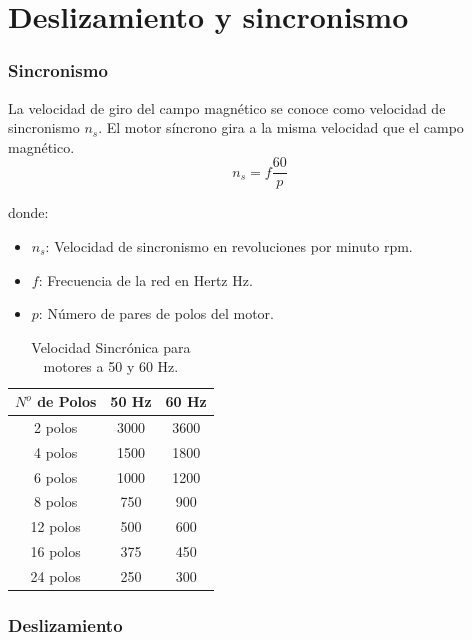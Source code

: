 \documentclass[../main]{subfiles}
\begin{document}
\chapter{Deslizamiento y sincronismo}
\begin{center}
\end{center}

\subsection{Sincronismo}
La velocidad de giro del campo magn\'etico{} se conoce como velocidad de sincronismo $n_s$. El motor s\'incrono{} gira a la misma velocidad que el campo magn\'etico.
\begin{equation}
n_s = f \frac{60}{p}
\end{equation}

donde:
\begin{itemize}
\item $n_s$: Velocidad de sincronismo en revoluciones por minuto \unit{rpm}.
\item $f$: Frecuencia de la red en Hertz \unit{Hz}.
\item $p$: N\'umero{} de pares de polos del motor.
\end{itemize}

\begin{table}[h!]
\centering
\begin{tabular}{|c|c|c|}
\hline
$N^o$ de Polos & 50 \unit{Hz} & 60 \unit{Hz} \\ \hline \hline
2 polos & 3000 & 3600 \\
4 polos & 1500 & 1800 \\
6 polos & 1000 & 1200 \\
8 polos & 750 & 900 \\
12 polos & 500 & 600 \\
16 polos & 375 & 450 \\
24 polos & 250 & 300 \\ \hline
\end{tabular}
\caption{Velocidad Sincr\'onica{} para motores a 50 y 60 Hz.}
\label{tab:vel_sincrona}
\end{table}

\subsection{Deslizamiento}

\end{document}
